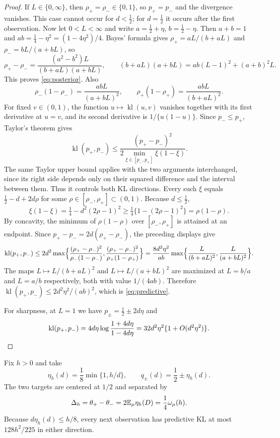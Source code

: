 \begin{proof}
If $L\in\{0,\infty\}$, then $\rho_+=\rho_-\in\{0,1\}$, so $p_+=p_-$ and the divergence vanishes.
This case cannot occur for $d<\tfrac12$; for $d=\tfrac12$ it occurs after the first
observation. Now let $0<L<\infty$ and write $a=\tfrac12+\eta$, $b=\tfrac12-\eta$. Then
$a+b=1$ and $ab=\tfrac14-\eta^2=(1-4\eta^2)/4$. Bayes' formula gives
$\rho_+=aL/(b+aL)$ and $\rho_-=bL/(a+bL)$, so
\[
\rho_+-\rho_-=\frac{(a^2-b^2)L}{(b+aL)(a+bL)},\qquad
(b+aL)(a+bL)=ab(L-1)^2+(a+b)^2L .
\]
This proves \eqref{eq:posterior}. Also
\[
\rho_-(1-\rho_-)=\frac{abL}{(a+bL)^2},\qquad
\rho_+(1-\rho_+)=\frac{abL}{(b+aL)^2}.
\]
For fixed $v\in(0,1)$, the function $u\mapsto\operatorname{kl}(u,v)$ vanishes together with its
first derivative at $u=v$, and its second derivative is $1/\{u(1-u)\}$. Since
$p_-\le p_+$, Taylor's theorem gives
\[
\operatorname{kl}(p_+,p_-)\le\frac{(p_+-p_-)^2}{2\min_{\xi\in[p_-,p_+]}\xi(1-\xi)}.
\]
The same Taylor upper bound applies with the two arguments interchanged,
since its right side depends only on their squared difference and the
interval between them. Thus it controls both KL directions.
Every such $\xi$ equals $\tfrac12-d+2d\rho$ for some $\rho\in[\rho_-,\rho_+]\subset(0,1)$. Because
$d\le\tfrac12$,
\[
\xi(1-\xi)=\tfrac14-d^2(2\rho-1)^2\ge\tfrac14\{1-(2\rho-1)^2\}=\rho(1-\rho).
\]
By concavity, the minimum of $\rho(1-\rho)$ over $[\rho_-,\rho_+]$ is attained at an endpoint.
Since $p_+-p_-=2d(\rho_+-\rho_-)$, the preceding displays give
\[
\operatorname{kl}(p_+,p_-)\le
2d^2\max\Bigl\{\frac{(\rho_+-\rho_-)^2}{\rho_-(1-\rho_-)},
\frac{(\rho_+-\rho_-)^2}{\rho_+(1-\rho_+)}\Bigr\}
=\frac{8d^2\eta^2}{ab}\max\Bigl\{\frac{L}{(b+aL)^2},\frac{L}{(a+bL)^2}\Bigr\}.
\]
The maps $L\mapsto L/(b+aL)^2$ and $L\mapsto L/(a+bL)^2$ are maximized at $L=b/a$ and
$L=a/b$ respectively, both with value $1/(4ab)$. Therefore
$\operatorname{kl}(p_+,p_-)\le2d^2\eta^2/(ab)^2$, which is \eqref{eq:predictive}.

For sharpness, at $L=1$ we have $p_\pm=\tfrac12\pm2d\eta$ and
\[
\operatorname{kl}(p_+,p_-)=4d\eta\log\frac{1+4d\eta}{1-4d\eta}=32d^2\eta^2\{1+O(d^2\eta^2)\}.
\qedhere
\]
\end{proof}

Fix $h>0$ and take
\begin{equation}\label{eq:hard-pair}
 \eta_h(d)=\frac18\min\{1,h/d\},\qquad
 q_\pm(d)=\frac12\pm\eta_h(d).
\end{equation}
The two targets are centered at $1/2$ and separated by
\begin{equation}\label{eq:separation}
 \Delta_h=\theta_+-\theta_-=2\mathbb E_\mu\eta_h(D)=\frac14\omega_\mu(h).
\end{equation}
Because $d\eta_h(d)\le h/8$, every next observation has predictive KL at
most $128h^2/225$ in either direction.

